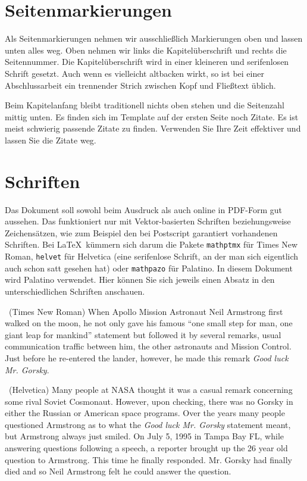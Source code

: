 \documentclass[11pt,a4paper]{report}
\begin{document}
\section{Seitenmarkierungen}

Als Seitenmarkierungen nehmen wir ausschließlich Markierungen
oben und lassen unten alles weg. 
Oben nehmen wir links die Kapitelüberschrift und rechts
die Seitennummer. 
Die Kapitelüberschrift wird in einer kleineren und 
serifenlosen Schrift gesetzt.
Auch wenn es vielleicht altbacken wirkt, so ist bei einer
Abschlussarbeit ein trennender Strich zwischen Kopf und 
Fließtext üblich.

Beim Kapitelanfang bleibt traditionell nichts oben stehen 
und die Seitenzahl mittig unten.
Es finden sich im Template auf der ersten Seite noch Zitate.
Es ist meist schwierig passende Zitate zu finden.
Verwenden Sie Ihre Zeit effektiver und lassen Sie die Zitate weg.


\section{Schriften}

Das Dokument soll sowohl beim Ausdruck als auch online in
PDF-Form gut aussehen. 
Das funktioniert nur mit Vektor-basierten Schriften beziehungsweise
Zeichensätzen, wie zum Beispiel den bei Postscript garantiert 
vorhandenen Schriften.
Bei \LaTeX\ kümmern sich darum die Pakete \verb|mathptmx| für
Times New Roman, \verb|helvet| für Helvetica (eine serifenlose
Schrift, an der man sich eigentlich auch schon satt gesehen 
hat) oder \verb|mathpazo| für Palatino. 
In diesem Dokument wird Palatino verwendet.
Hier können Sie sich jeweils einen Absatz in den unterschiedlichen 
Schriften anschauen.

\noindent\parbox[t]{\textwidth}{
\fontsize{11}{13pt}\selectfont \ 
(Times New Roman) When Apollo Mission Astronaut Neil Armstrong first 
walked on the moon, he not only gave his famous ``one small step 
for man, one giant leap for mankind'' statement but followed it by 
several remarks, usual communication traffic between him, the other
astronauts and Mission Control. 
Just before he re-entered the lander, however, he made this 
remark \textit{Good luck Mr. Gorsky}.
}

\noindent\parbox[t]{\textwidth}{
\fontsize{11}{13pt}\selectfont \ 
(Helvetica) Many people at NASA thought it was a casual remark concerning 
some rival Soviet Cosmonaut. 
However, upon checking, there was no Gorsky in either the
Russian or American space programs. 
Over the years many people questioned Armstrong as to what 
the \textit{Good luck Mr. Gorsky} statement meant, but Armstrong
always just smiled.
On July 5, 1995 in Tampa Bay FL, while answering questions following 
a speech, a reporter brought up the 26 year old question to Armstrong. 
This time he finally responded. Mr. Gorsky had finally died and so 
Neil Armstrong felt he could answer the question.
}
\end{document}
